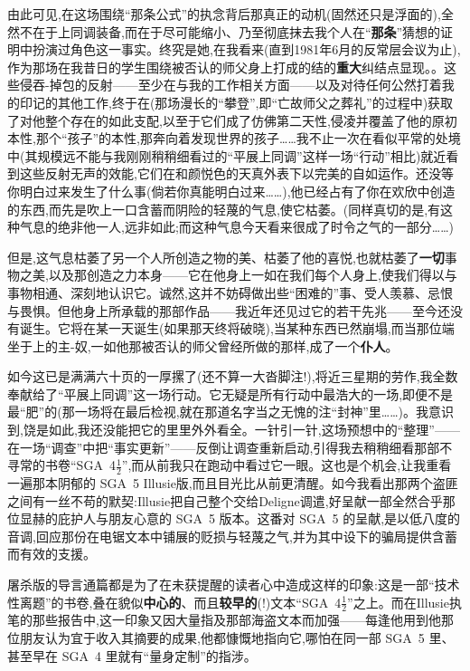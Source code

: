 {由此可见,在这场围绕“那条公式”的执念背后那真正的动机(固然还只是浮面的),全然不在于上同调装备,而在于尽可能缩小、乃至彻底抹去我个人在“\textbf{那条}”猜想的证明中扮演过角色这一事实。终究是她,在我看来(直到1981年6月的反常层会议为止),作为那场在我昔日的学生围绕被否认的师父身上打成的结的\textbf{重大}纠结点显现。}。这些侵吞-掉包的反射——至少在与我的工作相关方面\dmark{}——以及对待任何公然打着我的印记的其他工作,终于在(那场漫长的“攀登”,即“亡故师父之葬礼”的过程中)获取了对他整个存在的如此支配,以至于它们成了仿佛第二天性,侵凌并覆盖了他的原初本性,那个“孩子”的本性,那奔向着发现世界的孩子……我不止一次在看似平常的处境中(其规模远不能与我刚刚稍稍细看过的“平展上同调”这样一场“行动”相比)就近看到这些反射无声的效能,它们在和颜悦色的天真外表下以完美的自如运作。还没等你明白过来发生了什么事(倘若你真能明白过来……),他已经占有了你在欢欣中创造的东西,而先是吹上一口含蓄而阴险的轻蔑的气息,使它枯萎。(同样真切的是,有这种气息的绝非他一人,远非如此;而这种气息今天看来很成了时令之气的一部分……)

但是,这气息枯萎了另一个人所创造之物的美、枯萎了他的喜悦,也就枯萎了\textbf{一切}事物之美,以及那创造之力本身——它在他身上一如在我们每个人身上,使我们得以与事物相通、深刻地认识它。诚然,这并不妨碍做出些“困难的”事、受人羡慕、忌恨与畏惧。但他身上所承载的那部作品——我近年还见过它的若干先兆——至今还没有诞生。它将在某一天诞生(如果那天终将破晓),当某种东西已然崩塌,而当那位端坐于上的主-奴,一如他那被否认的师父曾经所做的那样,成了一个\textbf{仆人}。

如今这已是满满六十页的一厚摞了(还不算一大沓脚注!),将近三星期的劳作,我全数奉献给了“平展上同调”这一场行动。它无疑是所有行动中最浩大的一场,即便不是最“肥”的(那一场将在最后检视,就在那道名字当之无愧的注“封神”里……)。我意识到,饶是如此,我还没能把它的里里外外看全。一针引一针,这场预想中的“整理”——在一场“调查”中把“事实更新”——反倒让调查重新启动,引得我去稍稍细看那部不寻常的书卷“SGA~4$\frac{1}{2}$”,而从前我只在跑动中看过它一眼。这也是个机会,让我重看一遍那本阴郁的 SGA~5 Illusie版,而且目光比从前更清醒。如今我看出那两个盗匪之间有一丝不苟的默契:Illusie把自己整个交给Deligne调遣,好呈献一部全然\dmark{}合乎那位显赫的庇护人与朋友心意的 SGA~5 版本。这番对 SGA~5 的呈献,是以低八度的音调,回应那份在电锯文本中铺展的贬损与轻蔑之气,并为其中设下的骗局提供含蓄而有效的支援。

屠杀版的导言通篇都是为了在未获提醒的读者心中造成这样的印象:这是一部“技术性离题”的书卷,叠在貌似\textbf{中心的}、而且\textbf{较早的}(!)文本“SGA~4$\frac{1}{2}$”之上。而在Illusie执笔的那些报告中,这一印象又因大量指及那部海盗文本而加强——每逢他用到他那位朋友认为宜于收入其摘要的成果,他都慷慨地指向它,哪怕在同一部 SGA~5 里、甚至早在 SGA~4 里就有“量身定制”的指涉。

